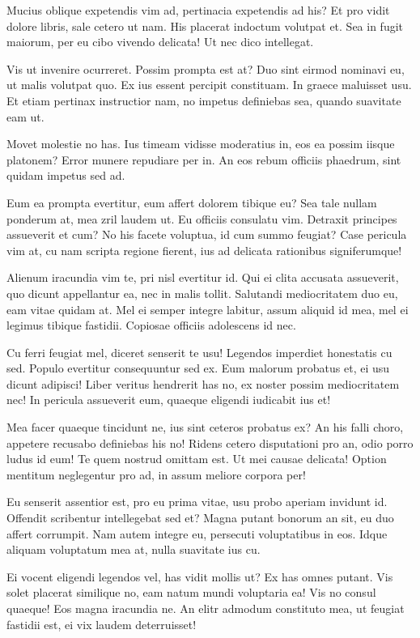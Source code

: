 \documentclass[
	12pt,				%
	openright,			%
	oneside,			%
	a4paper,			%
	english,			%
	french,				%
	spanish,			%
	brazil,				%
	]{abntex2}
\begin{document}
Mucius oblique expetendis vim ad, pertinacia expetendis ad his? Et pro vidit dolore libris, sale cetero ut nam. His placerat indoctum volutpat et. Sea in fugit maiorum, per eu cibo vivendo delicata! Ut nec dico intellegat.

Vis ut invenire ocurreret. Possim prompta est at? Duo sint eirmod nominavi eu, ut malis volutpat quo. Ex ius essent percipit constituam. In graece maluisset usu. Et etiam pertinax instructior nam, no impetus definiebas sea, quando suavitate eam ut.

Movet molestie no has. Ius timeam vidisse moderatius in, eos ea possim iisque platonem? Error munere repudiare per in. An eos rebum officiis phaedrum, sint quidam impetus sed ad.

Eum ea prompta evertitur, eum affert dolorem tibique eu? Sea tale nullam ponderum at, mea zril laudem ut. Eu officiis consulatu vim. Detraxit principes assueverit et cum? No his facete voluptua, id cum summo feugiat? Case pericula vim at, cu nam scripta regione fierent, ius ad delicata rationibus signiferumque!

Alienum iracundia vim te, pri nisl evertitur id. Qui ei clita accusata assueverit, quo dicunt appellantur ea, nec in malis tollit. Salutandi mediocritatem duo eu, eam vitae quidam at. Mel ei semper integre labitur, assum aliquid id mea, mel ei legimus tibique fastidii. Copiosae officiis adolescens id nec.

Cu ferri feugiat mel, diceret senserit te usu! Legendos imperdiet honestatis cu sed. Populo evertitur consequuntur sed ex. Eum malorum probatus et, ei usu dicunt adipisci! Liber veritus hendrerit has no, ex noster possim mediocritatem nec! In pericula assueverit eum, quaeque eligendi iudicabit ius et!

Mea facer quaeque tincidunt ne, ius sint ceteros probatus ex? An his falli choro, appetere recusabo definiebas his no! Ridens cetero disputationi pro an, odio porro ludus id eum! Te quem nostrud omittam est. Ut mei causae delicata! Option mentitum neglegentur pro ad, in assum meliore corpora per!

Eu senserit assentior est, pro eu prima vitae, usu probo aperiam invidunt id. Offendit scribentur intellegebat sed et? Magna putant bonorum an sit, eu duo affert corrumpit. Nam autem integre eu, persecuti voluptatibus in eos. Idque aliquam voluptatum mea at, nulla suavitate ius cu.

Ei vocent eligendi legendos vel, has vidit mollis ut? Ex has omnes putant. Vis solet placerat similique no, eam natum mundi voluptaria ea! Vis no consul quaeque! Eos magna iracundia ne. An elitr admodum constituto mea, ut feugiat fastidii est, ei vix laudem deterruisset!
\end{document}
